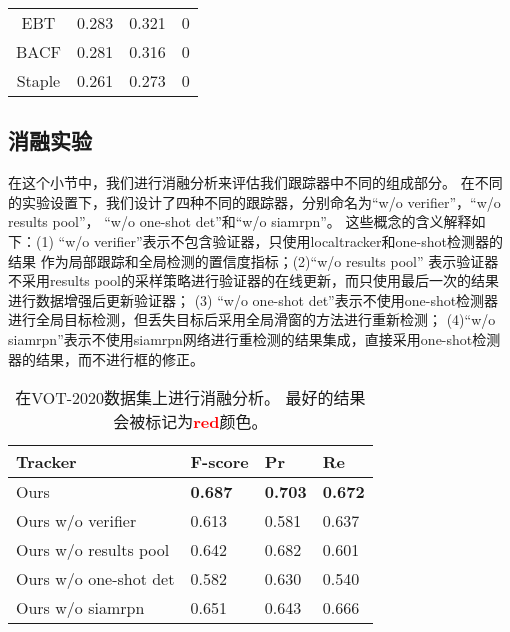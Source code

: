\documentclass[promaster]{thesis-uestc}
\begin{document}
\begin{table}[h]
\begin{center}
\begin{tabular}{cccc}
    EBT                & 0.283                                 & 0.321                                 & 0                                     \\
    BACF             & 0.281                                 & 0.316                                 & 0                                     \\
    Staple             & 0.261                                 & 0.273                                 & 0                                     \\
    \hline
    \end{tabular}
    \end{center}
\end{table}

\subsection{消融实验}
在这个小节中，我们进行消融分析来评估我们跟踪器中不同的组成部分。
在不同的实验设置下，我们设计了四种不同的跟踪器，分别命名为“w/o verifier”，“w/o results pool”，
“w/o one-shot det”和“w/o siamrpn”。
这些概念的含义解释如下：(1) “w/o verifier”表示不包含验证器，只使用localtracker和one-shot检测器的结果
作为局部跟踪和全局检测的置信度指标；(2)“w/o results pool”
表示验证器不采用results pool的采样策略进行验证器的在线更新，而只使用最后一次的结果进行数据增强后更新验证器；
(3) “w/o one-shot det”表示不使用one-shot检测器进行全局目标检测，但丢失目标后采用全局滑窗的方法进行重新检测；
(4)“w/o siamrpn”表示不使用siamrpn网络进行重检测的结果集成，直接采用one-shot检测器的结果，而不进行框的修正。
\begin{table}[!h]
    \caption{在VOT-2020数据集上进行消融分析。 
    最好的结果会被标记为\textcolor{red}{\textbf{red}}颜色。 }
    \vspace{-1mm}
    \begin{center}
    \begin{tabular}{p{3.8cm}<{\centering}p{1.2cm}<{\centering}
    p{0.7cm}<{\centering}p{0.7cm}}
    \hline
    \textbf{Tracker} & \textbf{F-score} & \textbf{Pr} & \textbf{Re} \\
    \hline
    Ours  & \textbf{\textcolor[rgb]{1,0,0}{0.687}} 
    & \textbf{\textcolor[rgb]{1,0,0}{0.703}} & \textbf{\textcolor[rgb]{1,0,0}{0.672}}\\
    Ours w/o verifier & 0.613 & 0.581 & 0.637\\
    Ours w/o results pool & 0.642 & 0.682 & 0.601\\
    Ours w/o one-shot det & 0.582 & 0.630 & 0.540\\
    Ours w/o siamrpn & 0.651 & 0.643 & 0.666\\
    \hline
    \end{tabular}
    \end{center}
    \label{tab:ablation}
    \vspace{-3mm}
\end{table}
\end{document}
